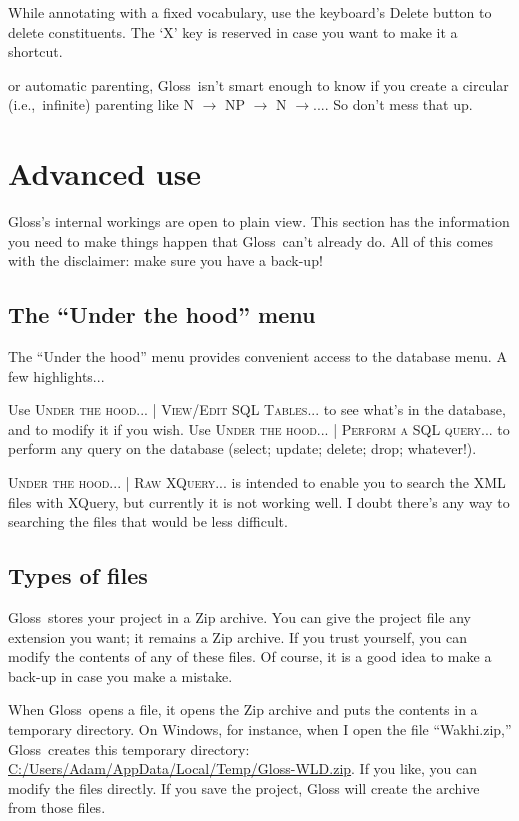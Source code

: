 \documentclass[oneside]{book}
\def\ie{i.e.,~}
\def\menu#1{\textsc{#1}}
\def\menu#1#2{\textsc{#1 | #2}}
\def\gloss{\textsf{Gloss}}
\def\tip#1\par{\medskip\noindent\fcolorbox{black}{light-gray}{\parbox{\textwidth}{#1}}\par\medskip}
\begin{document}
While annotating with a fixed vocabulary, use the keyboard's Delete button to delete constituents. The `X' key is reserved in case you want to make it a shortcut.

\tip For automatic parenting, \gloss\ isn't smart enough to know if you create a circular (\ie infinite) parenting like N $\to$ NP $\to$ N $\to ...$. So don't mess that up. 

\chapter{Advanced use}

\gloss's internal workings are open to plain view. This section has the information you need to make things happen that \gloss\ can't already do. All of this comes with the disclaimer: make sure you have a back-up!

\section{The ``Under the hood'' menu}
The ``Under the hood'' menu provides convenient access to the database menu. A few highlights... 

Use \menu{Under the hood...}{View/Edit SQL Tables...} to see what's in the database, and to modify it if you wish. Use  \menu{Under the hood...}{Perform a SQL query...} to perform any query on the database (select; update; delete; drop; whatever!).

\menu{Under the hood...}{Raw XQuery...} is intended to enable you to search the XML files with XQuery, but currently it is not working well. I doubt there's any way to searching the files that would be less difficult.

\section{Types of files}
\gloss\ stores your project in a Zip archive. You can give the project file any extension you want; it remains a Zip archive. If you trust yourself, you can modify the contents of any of these files. Of course, it is a good idea to make a back-up in case you make a mistake.

When \gloss\ opens a file, it opens the Zip archive and puts the contents in a temporary directory. On Windows, for instance, when I open the file ``Wakhi.zip,'' \gloss\ creates this temporary directory:  \url{C:/Users/Adam/AppData/Local/Temp/Gloss-WLD.zip}. If you like, you can modify the files directly. If you save the project, Gloss will create the archive from those files.
\end{document}
